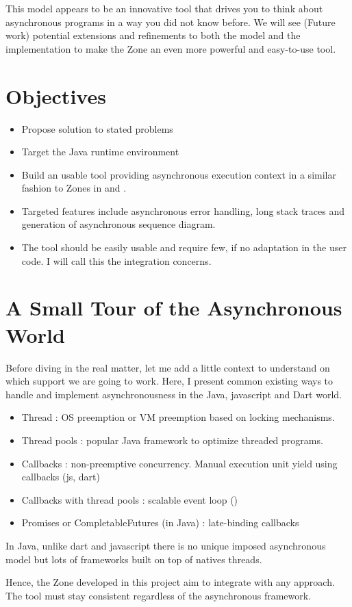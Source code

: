 This model appears to be an innovative tool that drives you to think about asynchronous programs in a way you did not know before. We will see (Future work) potential extensions and refinements to both the model and the implementation to make the Zone an even more powerful and easy-to-use tool.

\section{Objectives}

\begin{itemize}
\item Propose solution to stated problems
\item Target the Java runtime environment
\item Build an usable tool providing asynchronous execution context in a similar fashion to Zones in \zonejs and \zonedrt.
\item Targeted features include asynchronous error handling, long stack traces and generation of asynchronous sequence diagram.
\item The tool should be easily usable and require few, if no adaptation in the user code. I will call this the integration concerns.
\end{itemize}

\section{A Small Tour of the Asynchronous World}

Before diving in the real matter, let me add a little context to understand on which support we are going to work. Here, I present common existing ways to handle and implement asynchronousness in the Java, javascript and Dart world.
\begin{itemize}
\item Thread : OS preemption or VM preemption based on locking mechanisms.
\item Thread pools : popular Java framework to optimize threaded programs.
\item Callbacks : non-preemptive concurrency. Manual execution unit yield using callbacks (js, dart)
\item Callbacks with thread pools : scalable event loop (\vertx)
\item Promises or CompletableFutures (in Java) : late-binding callbacks
\end{itemize}

In Java, unlike dart and javascript there is no unique imposed asynchronous model but lots of frameworks built on top of natives threads.

Hence, the Zone developed in this project aim to integrate with any approach. The tool must stay consistent regardless of the asynchronous framework.